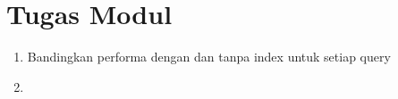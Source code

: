 
\chapter*{Tugas Modul}

\begin{enumerate}
    \item Bandingkan performa dengan dan tanpa index untuk setiap query \vspace{5px} %
    \lipsum[3] %
    \item \lipsum[4] %
\end{enumerate}